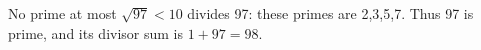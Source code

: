 No prime at most $\sqrt{97}<10 $ divides 97: these primes are 2,3,5,7. Thus 97 is prime, and its divisor sum is $ 1+97=\boxed{98}$.
